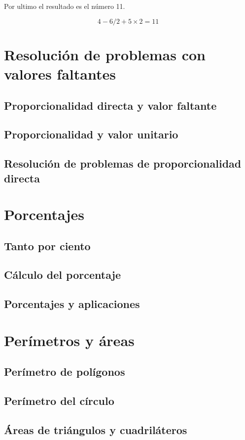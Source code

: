 \documentclass[11pt]{book}
\begin{document}
Por ultimo el resultado es el número 11.

\[4 - 6 / 2 + 5 \times 2 = 11\]

\section{Resolución de problemas con valores faltantes}

\subsection{Proporcionalidad directa y valor faltante}
\subsection{Proporcionalidad y valor unitario}
\subsection{Resolución de problemas de proporcionalidad directa}


\section{Porcentajes}
\subsection{Tanto por ciento}
\subsection{Cálculo del porcentaje}
\subsection{Porcentajes y aplicaciones}

\section{Perímetros y áreas}
\subsection{Perímetro de polígonos}
\subsection{Perímetro del círculo}
\subsection{Áreas de triángulos y cuadriláteros}
\end{document}
